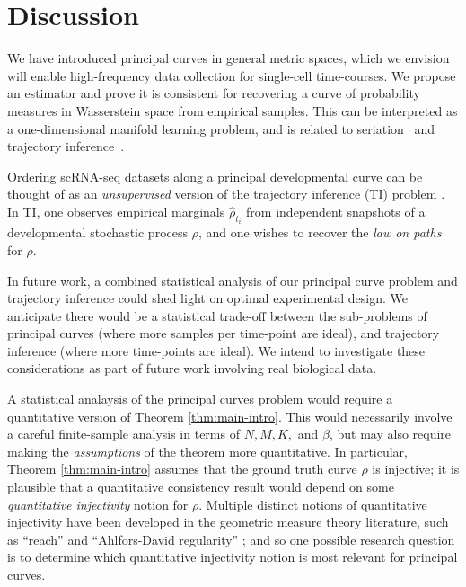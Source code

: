 \documentclass[aos, preprint]{imsart}
\theoremstyle{plain}
\theoremstyle{remark}
\begin{document}
{\section{Discussion}

We have introduced principal curves in general metric spaces, which we envision will enable high-frequency data collection for single-cell time-courses.
We propose an estimator and prove it is consistent for recovering a curve of probability measures in Wasserstein space from empirical samples.
This can be interpreted as a one-dimensional manifold learning problem, and is related to seriation~\cite{shah2016stochastically,flammarion2019optimal} and trajectory inference~\cite{lavenant2024towards}.

Ordering scRNA-seq datasets along a principal developmental curve can be thought of as an {\em unsupervised} version of the trajectory inference (TI) problem
\cite{schiebinger2021opinion,lavenant2024towards,chizat2022trajectory}.
In TI, one observes empirical marginals $\hat\rho_{t_i}$ from independent snapshots of a developmental stochastic process $\rho$, and one wishes to recover the {\em law on paths} for $\rho$.

In future work, a combined statistical analysis of our principal curve problem and {trajectory inference} could shed light on optimal experimental design. We anticipate there would be a statistical trade-off between the sub-problems of principal curves (where more samples per time-point are ideal), and trajectory inference (where more time-points are ideal). We intend to investigate these considerations as part of future work involving real biological data.


A statistical analaysis of the principal curves problem would require
 a quantitative version of Theorem \ref{thm:main-intro}. This would necessarily involve a careful finite-sample analysis in terms of $N,M,K,$ and $\beta$, but may also require making the \emph{assumptions} of the theorem more quantitative. In particular, Theorem \ref{thm:main-intro} assumes that the ground truth curve $\rho$ is injective; it is plausible that a quantitative consistency result would depend on some \emph{quantitative injectivity} notion for $\rho$. Multiple distinct notions of quantitative injectivity have been developed in the geometric measure theory literature, such as ``reach'' \cite{aamari2019reach, federer1969geometric} and ``Ahlfors-David regularity'' \cite{david1993analysis}; and so one possible research question is to determine which quantitative injectivity notion is most relevant for principal curves.}
\end{document}
